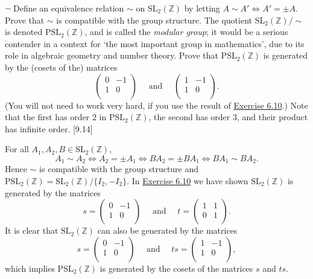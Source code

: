 \documentclass[12pt,letterpaper,boxed]{hmcpset}
\newcommand{\SL}{\mathrm{SL}}
\newcommand{\Z}{\mathbb{Z}}
\begin{document}
\begin{problem}[7.5]
$\neg$ Define an equivalence relation $\sim$ on $\SL_2(\Z)$ by letting $A\sim A'\iff A'=\pm A.$ Prove that $\sim$ is compatible with the group structure. The quotient $\SL_2(\Z)/\sim$ is denoted $\mathrm{PSL}_2(\Z)$, and is called the \emph{modular group}; it would be a serious contender in a context for \textquoteleft the most important group in mathematics', due to its role in algebraic geometry and number theory. Prove that $\mathrm{PSL}_2(\Z)$ is generated by the (cosets of the) matrices
\[
\begin{pmatrix}
0 & -1\\
1 & 0\\
\end{pmatrix}
\quad\text{ and }\quad 
\begin{pmatrix}
1 & -1\\
1 & 0\\
\end{pmatrix}.
\]
(You will not need to work very hard, if you use the result of \hyperlink{Exercise 6.10}{Exercise 6.10}.) Note that the first has order 2 in $\mathrm{PSL}_2(\Z)$, the second has order 3, and their product has infinite order. [9.14]
\end{problem}
\begin{solution}
For all $A_1,A_2,B\in \SL_2(\Z)$,
\[
A_1\sim A_2\iff A_2=\pm A_1\iff  BA_2=\pm BA_1\iff BA_1\sim BA_2.
\]	
Hence $\sim$ is compatible with the group structure and $\mathrm{PSL}_2(\Z)=\SL_2(\Z)/\{I_2,-I_2\}$. In \hyperlink{Exercise 6.10}{Exercise 6.10} we have shown $\SL_2(\Z)$ is generated by the matrices
\[
s =
\begin{pmatrix}
0 & -1\\
1 & 0\\
\end{pmatrix}
\quad\text{ and }\quad 
t =
\begin{pmatrix}
1 & 1\\
0 & 1\\
\end{pmatrix}.
\] 
It is clear that $\SL_2(\Z)$ can also be generated by the matrices
\[
s =
\begin{pmatrix}
0 & -1\\
1 & 0\\
\end{pmatrix}
\quad\text{ and }\quad 
ts =
\begin{pmatrix}
1 & -1\\
1 & 0\\
\end{pmatrix},
\] 
which implies $\mathrm{PSL}_2(\Z)$ is generated by the cosets of the matrices $s$ and $ts$.
\end{solution}
\end{document}

